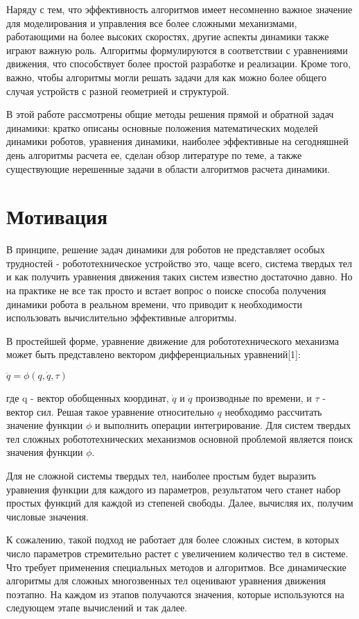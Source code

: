 \documentclass[a4paper,14pt]{extreport}
\begin{document}
Наряду с тем, что эффективность алгоритмов имеет несомненно важное значение для моделирования и управления все более сложными механизмами, работающими на более высоких скоростях, другие аспекты динамики также играют важную роль. 
Алгоритмы формулируются в соответствии с уравнениями движения, что способствует более простой разработке и реализации. Кроме того, важно, чтобы алгоритмы могли решать задачи для как можно более общего случая устройств с разной геометрией и структурой.

В этой работе рассмотрены общие методы решения прямой и обратной задач динамики: кратко описаны основные положения математических моделей динамики роботов, уравнения динамики, наиболее эффективные на сегодняшней день алгоритмы расчета ее, сделан обзор литературе по теме, а также существующие нерешенные задачи в области алгоритмов расчета динамики.

\newpage
\section{Мотивация}
В принципе, решение задач динамики для роботов не представляет особых трудностей - робототехническое устройство это, чаще всего, система твердых тел и как получить уравнения движения таких систем известно достаточно давно. Но на практике не все так просто и встает вопрос о поиске способа получения динамики робота в реальном времени, что приводит к необходимости использовать вычислительно эффективные алгоритмы.

В простейшей форме, уравнение движение для робототехнического механизма может быть представлено вектором дифференциальных уравнений[1]:

\begin{center}
$\ddot q = \phi(q, \dot q, \tau)$	
\end{center}
где q - вектор обобщенных координат, $\dot q$ и $\ddot q$ производные по времени, и $\tau$ - вектор сил. Решая такое уравнение относительно $q$ необходимо рассчитать значение функции $\phi$ и выполнить операции интегрирование. Для систем твердых тел сложных робототехнических механизмов основной проблемой является поиск значения функции $\phi$.

Для не сложной системы твердых тел, наиболее простым будет выразить уравнения функции для каждого из параметров, результатом чего станет набор простых функций для каждой из степеней свободы. Далее, вычисляя их, получим числовые значения.

К сожалению, такой подход не работает для более сложных систем, в которых число параметров стремительно растет с увеличением количество тел в системе. Что требует применения специальных методов и алгоритмов.
Все динамические алгоритмы для сложных многозвенных тел оценивают уравнения движения поэтапно. На каждом из этапов получаются значения, которые используются на следующем этапе вычислений и так далее.
\end{document}

